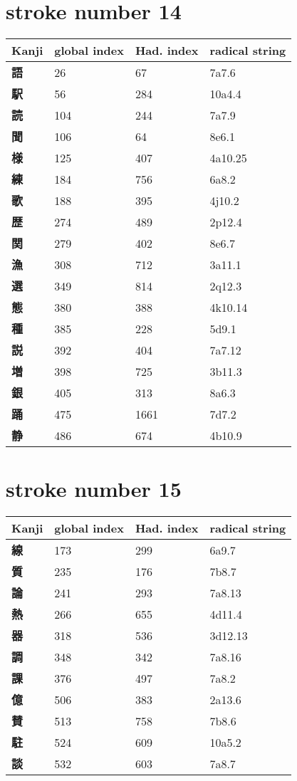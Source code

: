 \section{stroke number 14}
  \begin{longtable}[c]{llll}
    \bfseries Kanji & \bfseries global index & \bfseries Had. index & \bfseries radical string\\\hline\endhead
    \bfseries 語 & 26 & 67 & 7a7.6\\
    \bfseries 駅 & 56 & 284 & 10a4.4\\
    \bfseries 読 & 104 & 244 & 7a7.9\\
    \bfseries 聞 & 106 & 64 & 8e6.1\\
    \bfseries 様 & 125 & 407 & 4a10.25\\
    \bfseries 練 & 184 & 756 & 6a8.2\\
    \bfseries 歌 & 188 & 395 & 4j10.2\\
    \bfseries 歴 & 274 & 489 & 2p12.4\\
    \bfseries 関 & 279 & 402 & 8e6.7\\
    \bfseries 漁 & 308 & 712 & 3a11.1\\
    \bfseries 選 & 349 & 814 & 2q12.3\\
    \bfseries 態 & 380 & 388 & 4k10.14\\
    \bfseries 種 & 385 & 228 & 5d9.1\\
    \bfseries 説 & 392 & 404 & 7a7.12\\
    \bfseries 増 & 398 & 725 & 3b11.3\\
    \bfseries 銀 & 405 & 313 & 8a6.3\\
    \bfseries 踊 & 475 & 1661 & 7d7.2\\
    \bfseries 静 & 486 & 674 & 4b10.9\\
  \end{longtable}
\section{stroke number 15}
  \begin{longtable}[c]{llll}
    \bfseries Kanji & \bfseries global index & \bfseries Had. index & \bfseries radical string\\\hline\endhead
    \bfseries 線 & 173 & 299 & 6a9.7\\
    \bfseries 質 & 235 & 176 & 7b8.7\\
    \bfseries 論 & 241 & 293 & 7a8.13\\
    \bfseries 熱 & 266 & 655 & 4d11.4\\
    \bfseries 器 & 318 & 536 & 3d12.13\\
    \bfseries 調 & 348 & 342 & 7a8.16\\
    \bfseries 課 & 376 & 497 & 7a8.2\\
    \bfseries 億 & 506 & 383 & 2a13.6\\
    \bfseries 賛 & 513 & 758 & 7b8.6\\
    \bfseries 駐 & 524 & 609 & 10a5.2\\
    \bfseries 談 & 532 & 603 & 7a8.7\\
  \end{longtable}
